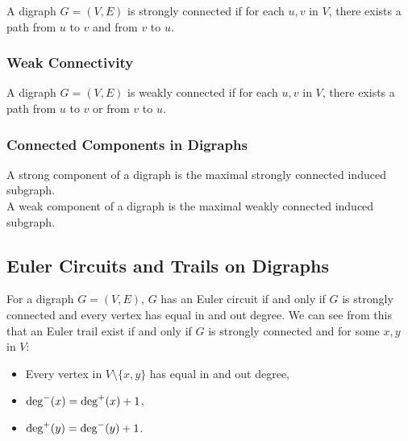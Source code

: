 A digraph $G = (V, E)$ is strongly connected if for each $u, v$
in $V$, there exists a path from $u$ to $v$ and from $v$ to $u$.

\subsubsection{Weak Connectivity}

A digraph $G = (V, E)$ is weakly connected if for each $u, v$
in $V$, there exists a path from $u$ to $v$ or from $v$ to $u$.

\subsubsection{Connected Components in Digraphs}

A strong component of a digraph is the maximal strongly
connected induced subgraph.
\\[\baselineskip]
A weak component of a digraph is the maximal weakly
connected induced subgraph.

\subsection{Euler Circuits and Trails on Digraphs}

For a digraph $G = (V, E)$, $G$ has an Euler circuit if and only 
if $G$ is strongly connected and every vertex has equal in and out
degree. We can see from this that an Euler trail exist if and only
if $G$ is strongly connected and for some $x, y$ in $V$: \begin{itemize}
    \item Every vertex in $V \setminus \{x, y\}$ has equal in and out degree,
    \item $\operatorname{deg}^-(x) = \operatorname{deg}^+(x) + 1$,
    \item $\operatorname{deg}^+(y) = \operatorname{deg}^-(y) + 1$.
\end{itemize}
